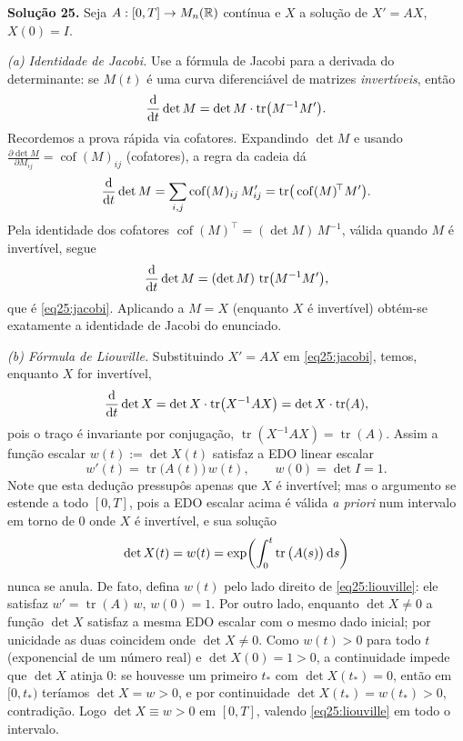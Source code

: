 \bigskip\noindent\textbf{Solução 25.}\quad
Seja $A:[0,T]\to M_n(\mathbb{R})$ contínua e $X$ a solução de $X'=A X$, $X(0)=I$.

\emph{(a) Identidade de Jacobi.}
Use a fórmula de Jacobi para a derivada do determinante: se $M(t)$ é uma curva diferenciável de matrizes \emph{invertíveis}, então
\begin{equation}\label{eq25:jacobi}
    \frac{\mathrm{d}}{\mathrm{d} t}\det M=\det M\cdot\operatorname{tr}\!\big(M^{-1}M'\big).
\end{equation}
Recordemos a prova rápida via cofatores. Expandindo $\det M$ e usando $\frac{\partial \det M}{\partial M_{ij}}=\operatorname{cof}(M)_{ij}$ (cofatores), a regra da cadeia dá
\[
    \frac{\mathrm{d}}{\mathrm{d} t}\det M=\sum_{i,j}\operatorname{cof}(M)_{ij}\,M'_{ij}
    =\operatorname{tr}\!\big(\operatorname{cof}(M)^{\!\top}M'\big).
\]
Pela identidade dos cofatores $\operatorname{cof}(M)^{\!\top}=(\det M)\,M^{-1}$, válida quando $M$ é invertível, segue
\[
    \frac{\mathrm{d}}{\mathrm{d} t}\det M=(\det M)\,\operatorname{tr}\!\big(M^{-1}M'\big),
\]
que é \eqref{eq25:jacobi}. Aplicando a $M=X$ (enquanto $X$ é invertível) obtém-se exatamente a identidade de Jacobi do enunciado.

\emph{(b) Fórmula de Liouville.}
Substituindo $X'=AX$ em \eqref{eq25:jacobi}, temos, enquanto $X$ for invertível,
\[
    \frac{\mathrm{d}}{\mathrm{d} t}\det X=\det X\cdot\operatorname{tr}\!\big(X^{-1}AX\big)
    =\det X\cdot\operatorname{tr}(A),
\]
pois o traço é invariante por conjugação, $\operatorname{tr}(X^{-1}AX)=\operatorname{tr}(A)$. Assim a função escalar $w(t):=\det X(t)$ satisfaz a EDO linear escalar
\[
    w'(t)=\operatorname{tr}\big(A(t)\big)\,w(t),\qquad w(0)=\det I=1 .
\]
Note que esta dedução pressupôs apenas que $X$ é invertível; mas o argumento se estende a todo $[0,T]$, pois a EDO escalar acima é válida \emph{a priori} num intervalo em torno de $0$ onde $X$ é invertível, e sua solução
\begin{equation}\label{eq25:liouville}
    \det X(t)=w(t)=\exp\!\left(\int_0^t \operatorname{tr}\big(A(s)\big)\,\mathrm{d} s\right)
\end{equation}
nunca se anula. De fato, defina $w(t)$ pelo lado direito de \eqref{eq25:liouville}: ele satisfaz $w'=\operatorname{tr}(A)\,w$, $w(0)=1$. Por outro lado, enquanto $\det X\neq0$ a função $\det X$ satisfaz a mesma EDO escalar com o mesmo dado inicial; por unicidade as duas coincidem onde $\det X\neq0$. Como $w(t)>0$ para todo $t$ (exponencial de um número real) e $\det X(0)=1>0$, a continuidade impede que $\det X$ atinja $0$: se houvesse um primeiro $t_*$ com $\det X(t_*)=0$, então em $[0,t_*)$ teríamos $\det X=w>0$, e por continuidade $\det X(t_*)=w(t_*)>0$, contradição. Logo $\det X\equiv w>0$ em $[0,T]$, valendo \eqref{eq25:liouville} em todo o intervalo.


